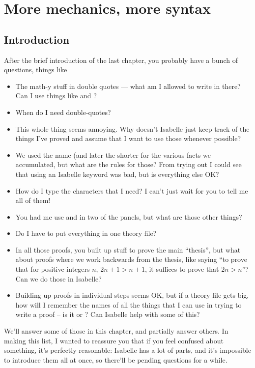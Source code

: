 \chapter{More mechanics, more syntax}
\section{Introduction}
After the brief introduction of the last chapter, you probably have a bunch of questions, things like 
\begin{itemize}
\item    
The math-y stuff in double quotes --- what am I allowed to write in there? Can I use things like  and ? 
\item    
When do I need double-quotes? 
\item    
This whole  thing seems annoying. Why doesn't Isabelle just keep track of the things I've proved and assume that I want to use those whenever possible? 
\item    
We used the name  (and later the shorter  for the various facts we accumulated, but what are the rules for those? From trying out  I could see that using an Isabelle keyword was bad, but is everything else OK? 
\item    
How do I type the characters that I need? I can't just wait for you to tell me all of them!
\item    
You had me use  and  in two of the panels, but what are those other things? 
\item    
Do I have to put everything in one theory file?
\item    
In all those proofs, you built up stuff to prove the main ``thesis'', but what about proofs where we work backwards from the thesis, like saying ``to prove that for positive integers $n$,  $2n + 1 > n + 1$, it suffices to prove  that $2n > n$''? Can we do those in Isabelle? 
\item    
Building up proofs in individual steps seems OK, but if a theory file gets big, how will I remember the names of all the things that I can use in trying to write a proof -- is it  or ? Can Isabelle help with some of this?
\end{itemize}

We'll answer some of those in this chapter, and partially answer others. In making this list, I wanted to reassure you that if you feel confused about something, it's perfectly reasonable: Isabelle has a lot of parts, and it's impossible to introduce them all at once, so there'll be pending questions for a while.

